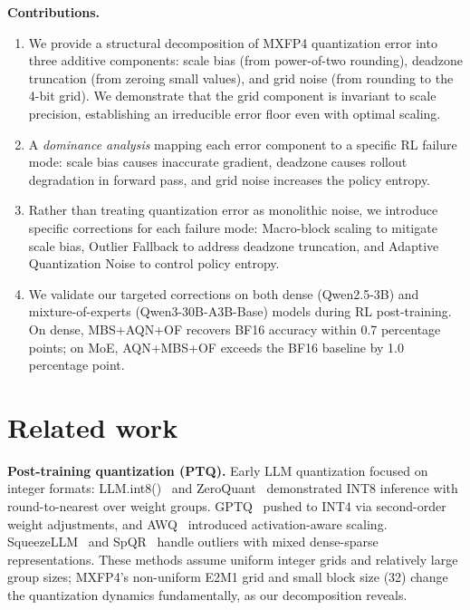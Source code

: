 \documentclass{article}
\theoremstyle{definition}
\theoremstyle{remark}
\begin{document}

\textbf{Contributions.}
\begin{enumerate}
\item We provide a structural decomposition of MXFP4 quantization error into three additive components: scale bias (from power-of-two rounding), deadzone truncation (from zeroing small values), and grid noise (from rounding to the 4-bit grid). We demonstrate that the grid component is invariant to scale precision, establishing an irreducible error floor even with optimal scaling.
\item A \textit{dominance analysis} mapping each error component to a specific RL failure mode: scale bias causes inaccurate gradient, deadzone causes rollout degradation in forward pass, and grid noise increases the policy entropy.
\item Rather than treating quantization error as monolithic noise, we introduce specific corrections for each failure mode: Macro-block scaling to mitigate scale bias, Outlier Fallback to address deadzone truncation, and Adaptive Quantization Noise to control policy entropy.
\item We validate our targeted corrections on both dense (Qwen2.5-3B) and mixture-of-experts (Qwen3-30B-A3B-Base) models during RL post-training. On dense, MBS+AQN+OF recovers BF16 accuracy within 0.7 percentage points; on MoE, AQN+MBS+OF exceeds the BF16 baseline by 1.0 percentage point.
\end{enumerate}


\section{Related work}
\label{sec:related}

\textbf{Post-training quantization (PTQ).}
Early LLM quantization focused on integer formats: LLM.int8()~\citep{dettmers2022llmint8} and ZeroQuant~\citep{yao2022zeroquant} demonstrated INT8 inference with round-to-nearest over weight groups. GPTQ~\citep{frantar2023gptq} pushed to INT4 via second-order weight adjustments, and AWQ~\citep{lin2024awq} introduced activation-aware scaling. SqueezeLLM~\citep{kim2024squeezellm} and SpQR~\citep{dettmers2024spqr} handle outliers with mixed dense-sparse representations. These methods assume uniform integer grids and relatively large group sizes; MXFP4's non-uniform E2M1 grid and small block size (32) change the quantization dynamics fundamentally, as our decomposition reveals.
\end{document}
